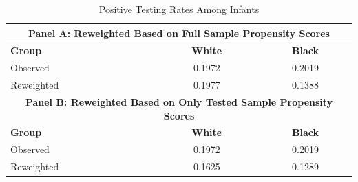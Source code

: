 \begin{table}[ht]
\centering
\caption{Positive Testing Rates Among Infants}
\label{tab:positive_testing_rates}
\begin{tabular}{lcc}
\hline
\multicolumn{3}{c}{\textbf{Panel A: Reweighted Based on Full Sample Propensity Scores}} \\
\hline
\textbf{Group} & \textbf{White} & \textbf{Black} \\
\hline
Observed   &  0.1972 & 0.2019 \\
Reweighted &  0.1977 & 0.1388 \\
\hline
\multicolumn{3}{c}{\textbf{Panel B: Reweighted Based on Only Tested Sample Propensity Scores}} \\
\hline
\textbf{Group} & \textbf{White} & \textbf{Black} \\
\hline
Observed   & 0.1972 & 0.2019 \\
Reweighted & 0.1625 & 0.1289 \\
\hline
\end{tabular}
\end{table}
